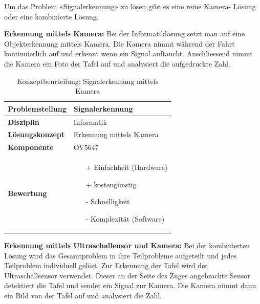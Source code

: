 \documentclass[../../main.tex]{subfiles}
\begin{document}
    Um das Problem «Signalerkennung» zu lösen gibt es eine reine Kamera- Lösung oder eine kombinierte
    Lösung.

    \textbf{Erkennung mittels Kamera:}
    Bei der Informatiklösung setzt man auf eine Objekterkennung mittels Kamera. Die Kamera nimmt während der Fahrt
    kontinuierlich auf und erkennt wenn ein Signal auftaucht. Anschliessend nimmt die Kamera ein Foto der Tafel auf und
    analysiert die aufgedruckte Zahl. 

    \begin{flushleft}
        \begin{table}[H]
        \begin{tabular}{ | l | p{11cm} |}
        \hline
        \textbf{Problemstellung} & Signalerkennung \\ \hline
        \textbf{Disziplin} & Informatik \\ \hline
        \textbf{Lösungskonzept} & Erkennung mittels Kamera \\ \hline
        \textbf{Komponente} & OV5647 \\ \hline
        \textbf{Bewertung} &  \begin{itemize}
                                \item[+] Einfachheit (Hardware)
                                \item[+] kostengünstig
                                \item[-] Schnelligkeit
                                \item[-] Komplexität (Software)   
                              \end{itemize} \\ \hline
        \end{tabular}
        \caption{Konzeptbeurteilung: Signalerkennung mittels Kamera}
        \label{tab:konzept_wurfel_Stereokamera}
    \end{table}
    \end{flushleft}

    \textbf{Erkennung mittels Ultraschallensor und Kamera:}
    Bei der kombinierten Lösung wird das Gesamtproblem in ihre Teilprobleme aufgeteilt und jedes Teilproblem
    individuell gelöst. Zur Erkennung der Tafel wird der Ultraschallsensor verwendet. Dieser an der Seite des Zuges
    angebrachte Sensor detektiert die Tafel und sendet ein Signal zur Kamera. Die Kamera nimmt dann ein Bild von der Tafel
    auf und analysiert die Zahl.\\
\end{document}
